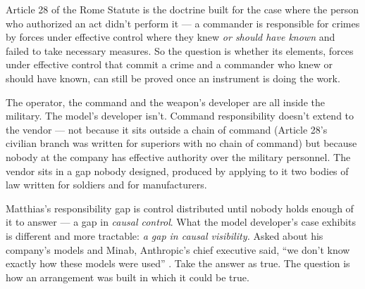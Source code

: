 Article 28 of the Rome Statute \autocite{icc1998rome} is the doctrine built for the case where the person who authorized an act didn't perform it — a commander is responsible for crimes by forces under effective control where they knew \emph{or should have known} and failed to take necessary measures.
So the question is whether its elements, forces under effective control that commit a crime and a commander who knew or should have known, can still be proved once an instrument is doing the work.


The operator, the command and the weapon's developer are all inside the military. The model's developer isn't. Command responsibility doesn't extend to the vendor — not because it sits outside a chain of command (Article 28's civilian branch was written for superiors with no chain of command) but because nobody at the company has effective authority over the military personnel.
The vendor sits in a gap nobody designed, produced by applying to it two bodies of law written for soldiers and for manufacturers.


Matthias's responsibility gap is control distributed until nobody holds enough of it to answer \autocite{matthias2004responsibility} — a gap in \emph{causal control}. What the model developer's case exhibits is different and more tractable: \emph{a gap in causal visibility.} Asked about his company's models and Minab, Anthropic's chief executive said, “we don't know exactly how these models were used” \autocite{tnw2026amodeicircuit}. Take the answer as true. The question is how an arrangement was built in which it could be true.

